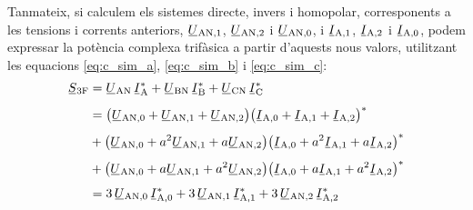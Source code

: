 Tanmateix, si calculem els sistemes directe, invers i homopolar,
corresponents a les tensions i corrents anteriors,
$\cmplx{U}\ped{AN,1}$, $\cmplx{U}\ped{AN,2}$ i
$\cmplx{U}\ped{AN,0}$, i $\cmplx{I}\ped{A,1}$,
$\cmplx{I}\ped{A,2}$ i $\cmplx{I}\ped{A,0}$, podem
expressar la potència complexa trifàsica a partir d'aquests nous
valors, utilitzant les equacions \eqref{eq:c_sim_a},
\eqref{eq:c_sim_b} i \eqref{eq:c_sim_c}:
\begin{equation}
\begin{split}
   \cmplx{S}\ped{3F} &= \cmplx{U}\ped{AN} \,\cmplx{I}\ped{A}^* +
   \cmplx{U}\ped{BN} \,\cmplx{I}\ped{B}^* +  \cmplx{U}\ped{CN} \,\cmplx{I}\ped{C}^*  \\[1ex]
   &= \big(\cmplx{U}\ped{AN,0} + \cmplx{U}\ped{AN,1} +
   \cmplx{U}\ped{AN,2}\big) \big(\cmplx{I}\ped{A,0} + \cmplx{I}\ped{A,1} +
   \cmplx{I}\ped{A,2}\big)^*   \\[1ex]
   &+ \big(\cmplx{U}\ped{AN,0} + a^2 \cmplx{U}\ped{AN,1} +
   a \cmplx{U}\ped{AN,2} \big) \big(\cmplx{I}\ped{A,0} + a^2 \cmplx{I}\ped{A,1}
    + a \cmplx{I}\ped{A,2} \big)^*  \\[1ex]
   &+ \big(\cmplx{U}\ped{AN,0} + a \cmplx{U}\ped{AN,1} + a^2
   \cmplx{U}\ped{AN,2} \big) \big(\cmplx{I}\ped{A,0} + a
   \cmplx{I}\ped{A,1} + a^2 \cmplx{I}\ped{A,2} \big)^*   \\[1ex]
   &= 3\, \cmplx{U}\ped{AN,0} \, \cmplx{I}\ped{A,0}^* +
      3\, \cmplx{U}\ped{AN,1} \, \cmplx{I}\ped{A,1}^* +
      3\, \cmplx{U}\ped{AN,2}\,  \cmplx{I}\ped{A,2}^*
    \label{eq:c_sim_s}
\end{split}
\end{equation}



